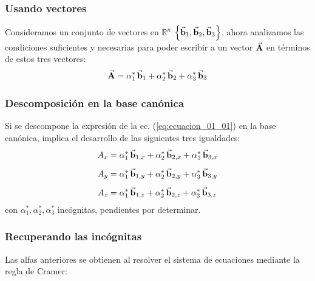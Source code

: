 \documentclass[12pt]{beamer}
\begin{document}
\begin{frame}
\frametitle{Usando vectores}
Consideramos un conjunto de vectores en $\mathbb{R}^{n}$ $\left\{ \va{b}_{1}, \va{b}_{2}, \va{b}_{3}  \right\}$, ahora analizamos las condiciones suficientes y necesarias para poder escribir a un vector $\va{A}$ en términos de estos tres vectores:
\begin{align}
\va{A} = \alpha^{*}_{1} \, \va{b}_{1} + \alpha^{*}_{2} \, \va{b}_{2} + \alpha^{*}_{3} \, \va{b}_{3}
\label{eq:ecuacion_01_01}
\end{align}
\end{frame}
\begin{frame}
\frametitle{Descomposición en la base canónica}
Si se descompone la expresión de la ec. (\ref{eq:ecuacion_01_01}) en la base canónica, implica el desarrollo de las siguientes tres igualdades:
\pause
\begin{align}
\begin{aligned}
A_{x} &= \alpha^{*}_{1} \, \va{b}_{1,x} + \alpha^{*}_{2} \, \va{b}_{2,x} + \alpha^{*}_{3} \, \va{b}_{3,x} \\[0.5em]
A_{y} &= \alpha^{*}_{1} \, \va{b}_{1,y} + \alpha^{*}_{2} \, \va{b}_{2,y} + \alpha^{*}_{3} \, \va{b}_{3,y} \\[0.5em]
A_{z} &= \alpha^{*}_{1} \, \va{b}_{1,z} + \alpha^{*}_{2} \, \va{b}_{2,z} + \alpha^{*}_{3} \, \va{b}_{3,z}
\end{aligned}
\label{eq:ecuacion_01_02}
\end{align}
con $\alpha^{*}_{1}, \alpha^{*}_{2}, \alpha^{*}_{3}$ incógnitas, pendientes por determinar.
\end{frame}
\begin{frame}
\frametitle{Recuperando las incógnitas}
Las alfas anteriores se obtienen al resolver el sistema de ecuaciones mediante la regla de Cramer:
\end{frame}
\end{document}
